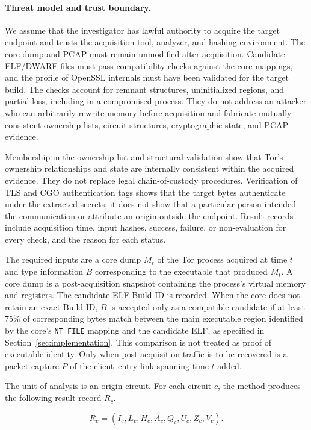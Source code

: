 \documentclass[10pt,a4paper]{article}
\newcommand{\code}[1]{\nolinkurl{#1}}
\begin{document}
\paragraph{Threat model and trust boundary.}
We assume that the investigator has lawful authority to acquire the target endpoint and trusts the acquisition tool, analyzer, and hashing environment. The core dump and PCAP must remain unmodified after acquisition. Candidate ELF/DWARF files must pass compatibility checks against the core mappings, and the profile of OpenSSL internals must have been validated for the target build. The checks account for remnant structures, uninitialized regions, and partial loss, including in a compromised process. They do not address an attacker who can arbitrarily rewrite memory before acquisition and fabricate mutually consistent ownership lists, circuit structures, cryptographic state, and PCAP evidence.

Membership in the ownership list and structural validation show that Tor's ownership relationships and state are internally consistent within the acquired evidence. They do not replace legal chain-of-custody procedures. Verification of TLS and CGO authentication tags shows that the target bytes authenticate under the extracted secrets; it does not show that a particular person intended the communication or attribute an origin outside the endpoint. Result records include acquisition time, input hashes, success, failure, or non-evaluation for every check, and the reason for each status.

The required inputs are a core dump $M_t$ of the Tor process acquired at time $t$ and type information $B$ corresponding to the executable that produced $M_t$. A core dump is a post-acquisition snapshot containing the process's virtual memory and registers. The candidate ELF Build ID is recorded. When the core does not retain an exact Build ID, $B$ is accepted only as a compatible candidate if at least 75\% of corresponding bytes match between the main executable region identified by the core's \code{NT_FILE} mapping and the candidate ELF, as specified in Section~\ref{sec:implementation}. This comparison is not treated as proof of executable identity. Only when post-acquisition traffic is to be recovered is a packet capture $P$ of the client--entry link spanning time $t$ added.

The unit of analysis is an origin circuit. For each circuit $c$, the method produces the following result record $R_c$.

\begin{equation}
R_c=(I_c,L_c,H_c,A_c,Q_c,U_c,Z_c,V_c).
\label{eq:result-record}
\end{equation}
\end{document}
